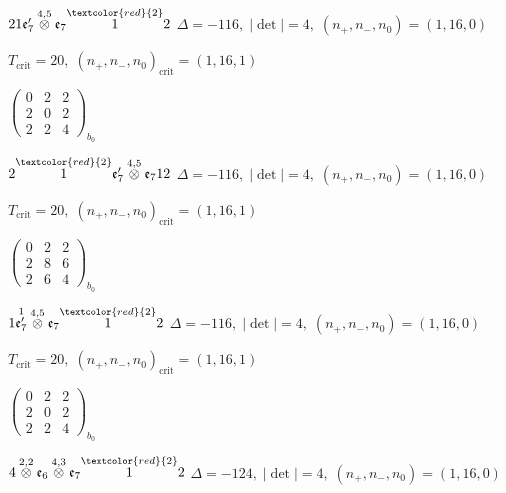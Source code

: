 \documentclass[10pt]{article}
\begin{document}
$21\mathfrak{e}_7'\overset{4,5}{\otimes}\mathfrak{e}_7\overset{\textcolor{red}{2}}{1}2$ \quad $\Delta=-116,\; |\det|=4,\; (n_+,n_-,n_0)=(1,16,0)$

\hspace{1em}$T_{\text{crit}}=20,\; (n_+,n_-,n_0)_{\text{crit}}=(1,16,1)$

\hspace{2em}$\left(\begin{smallmatrix}0 & 2 & 2 \\ 2 & 0 & 2 \\ 2 & 2 & 4\end{smallmatrix}\right)_{\!b_0}$

$2\overset{\textcolor{red}{2}}{1}\mathfrak{e}_7'\overset{4,5}{\otimes}\mathfrak{e}_712$ \quad $\Delta=-116,\; |\det|=4,\; (n_+,n_-,n_0)=(1,16,0)$

\hspace{1em}$T_{\text{crit}}=20,\; (n_+,n_-,n_0)_{\text{crit}}=(1,16,1)$

\hspace{2em}$\left(\begin{smallmatrix}0 & 2 & 2 \\ 2 & 8 & 6 \\ 2 & 6 & 4\end{smallmatrix}\right)_{\!b_0}$

\smallskip

$1\overset{1}{\mathfrak{e}_7'}\overset{4,5}{\otimes}\mathfrak{e}_7\overset{\textcolor{red}{2}}{1}2$ \quad $\Delta=-116,\; |\det|=4,\; (n_+,n_-,n_0)=(1,16,0)$

\hspace{1em}$T_{\text{crit}}=20,\; (n_+,n_-,n_0)_{\text{crit}}=(1,16,1)$

\hspace{2em}$\left(\begin{smallmatrix}0 & 2 & 2 \\ 2 & 0 & 2 \\ 2 & 2 & 4\end{smallmatrix}\right)_{\!b_0}$

\smallskip

$4\overset{2,2}{\otimes}\mathfrak{e}_6\overset{4,3}{\otimes}\mathfrak{e}_7\overset{\textcolor{red}{2}}{1}2$ \quad $\Delta=-124,\; |\det|=4,\; (n_+,n_-,n_0)=(1,16,0)$
\end{document}
